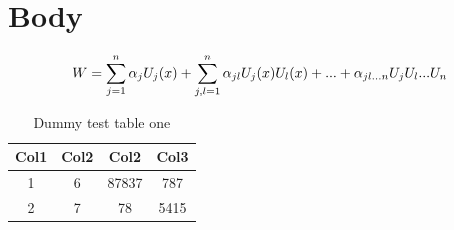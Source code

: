 \section{Body}
    
    \vspace{0.3cm}
    \noindent
    \begin{equation}
        W = \sum_{j=1}^{n} \alpha_j U_j(x) + \sum_{j,l=1}^{n} \alpha_{jl} U_j(x) U_l(x) + ... + \alpha_{jl...n} U_j U_l ... U_n
        \label{equation:eq_one}
        \indexequation{Test equation one}
    \end{equation}
    \vspace{0.3cm}
    
    \noindent
    \begin{table}[h!]
        \caption{Dummy test table one}
        \centering
        \begin{tabular}{||c c c c||} 
            \hline
            Col1 & Col2 & Col2 & Col3 \\ [0.5ex] 
            \hline\hline
            1 & 6 & 87837 & 787 \\ 
            \hline
            2 & 7 & 78 & 5415 \\
            \hline
        \end{tabular}
        \label{table:table_one}
    \end{table}
    
